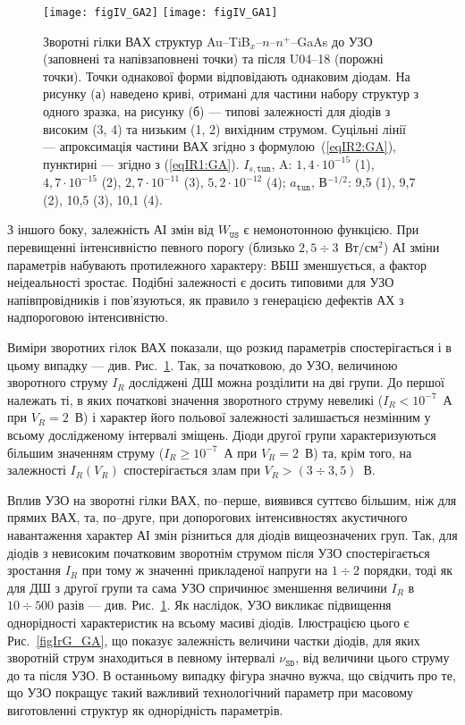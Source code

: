 \documentclass[a4paper,14pt,oneside,openany]{memoir}
\begin{document}
\begin{figure}
\center
\texttt{[image: figIV\_GA2]} \hfill
\texttt{[image: figIV\_GA1]}
\caption{\label{figIV_GA}
Зворотні гілки ВАХ структур Au--TiB$_x$--$n$--$n^+$--GaAs
до УЗО (заповнені та напівзаповнені точки)
та після U04--18 (порожні точки).
Точки однакової форми відповідають однаковим діодам.
На рисунку (а) наведено криві, отримані для частини набору структур з одного зразка,
на рисунку (б) --- типові залежності для діодів з високим (3, 4) та низьким (1, 2)
вихідним струмом.
Суцільні лінії --- апроксимація частини ВАХ згідно з формулою~(\ref{eqIR2:GA}),
пунктирні  --- згідно з (\ref{eqIR1:GA}).
$I_{s,\mathtt{tun}}$, A: $1,4\cdot10^{-15}$ (1), $4,7\cdot10^{-15}$ (2), $2,7\cdot10^{-11}$ (3), $5,2\cdot10^{-12}$ (4);
$a_\mathtt{tun}$, В$^{-1/2}$: 9,5 (1), 9,7 (2), 10,5 (3), 10,1 (4).
}%
\end{figure}

З іншого боку, залежність АІ змін від $W_\mathtt{US}$ є немонотонною функцією.
При перевищенні інтенсивністю певного порогу (близько $2,5\div3$~Вт/см$^2$) АІ зміни параметрів набувають
протилежного характеру:  ВБШ зменшується, а фактор неідеальності зростає.
Подібні залежності є досить типовими для УЗО напівпровідників \cite{Zdeb1989,Zaver,Zaver2005}
і пов'язуються, як правило з генерацією дефектів АХ з надпороговою інтенсивністю.



Виміри зворотних гілок ВАХ показали, що розкид параметрів спостерігається і в цьому випадку ---
див. Рис.~\ref{figIV_GA}.
Так, за початковою, до УЗО, величиною зворотного струму $I_R$ досліджені ДШ можна розділити на дві групи.
До першої належать ті, в яких початкові значення зворотного струму невеликі ($I_R<10^{-7}$~А
при $V_R=2$~В) і характер його
польової залежності залишається незмінним у всьому дослідженому інтервалі зміщень.
Діоди другої групи характеризуються більшим значенням струму ($I_R\geq10^{-7}$~А при $V_R=2$~В) та, крім того, на залежності $I_R(V_R)$ спостерігається злам при $V_R>(3\div3,5)$~В.


Вплив УЗО на зворотні гілки ВАХ, по--перше, виявився суттєво більшим, ніж для прямих ВАХ, та, по--друге,
при допорогових інтенсивностях акустичного навантаження характер АІ змін різниться для діодів вищеозначених груп.
Так, для діодів з невисоким початковим зворотнім струмом після УЗО спостерігається зростання $I_R$ при тому ж значенні прикладеної напруги на $1\div2$ порядки,
тоді як для ДШ з другої групи та сама УЗО спричинює зменшення величини $I_R$ в $10\div500$ разів --- див. Рис.~\ref{figIV_GA}.
Як наслідок, УЗО викликає підвищення однорідності характеристик на всьому масиві діодів.
Ілюстрацією цього є Рис.~\ref{figIrG_GA}, що показує залежність величини частки діодів, для яких зворотній струм знаходиться в певному інтервалі $\nu_\mathtt{SD}$,
від величини цього струму до та після УЗО.
В останньому випадку фігура значно вужча, що свідчить про те, що УЗО покращує такий важливий технологічний параметр при масовому виготовленні структур як однорідність параметрів.
\end{document}
